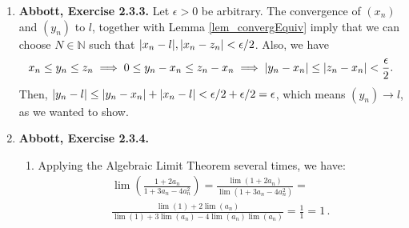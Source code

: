 \documentclass{article}
\newcounter{lemmaCounter}
\newenvironment{shortlemma}[1]{\refstepcounter{lemmaCounter}
\label{#1}\textbf{Lemma~\thelemmaCounter.}\em}
\DeclarePairedDelimiter\abs{\lvert}{\rvert}
\newcommand{\N}{\mathbb{N}}
\newcommand{\ra}{\rightarrow}
\newcommand{\exc}[2][Abbott]{\item \textbf{#1, Exercise #2.}}
\newcommand{\lep}[1][L]{#1et $\epsilon > 0$ be arbitrary}
\let\oldmax\max
\renewcommand{\max}[1]{\oldmax \left( #1 \right)}
\begin{document}
\begin{enumerate}
\begin{enumerate}
		\item Let $\epsilon > 0$ be arbitrary. Since $(x_n) \rightarrow 2$, we can choose a natural number $N_1$ such that $|x_n-2| < 2\epsilon$ for all $n \geq N_1$. We can also find a natural $N_2$ such that $\abs*{2-x_n} < 1$, for all $n \geq N_2$, which implies $|x_n| > 1$. Let $N := \max{N_1, N_2}$. Then, for all $n \geq N$, we have \begin{equation*}
		      \abs*{\frac{1}{x_n}-\frac{1}{2}} = \abs*{\frac{2-x_n}{2x_n}} < \abs*{\frac{x_n-2}{2}} < \epsilon.
		\end{equation*}
	\end{enumerate}
	
	\begin{shortlemma}{lem_convergEquiv}
	    If $(x_n), (y_n) \rightarrow L$ for some real number $L$, then for every $\epsilon > 0$ there is some natural $N$ such that $\abs*{x_n-y_n} < \epsilon$ for all $n \geq N$.
	\end{shortlemma}
	\begin{proof}
    \lep \space and use the fact that both the sequences converge to find $N_1, N_2 \in \N$ such that $\abs*{x_n - L} < \epsilon/2$ for all $n \geq N_1$ and $\abs*{y_m-L} < \epsilon/2$ for all $m \geq N_2$. Setting $N := \max{N_1, N_2}$ we have $\abs*{x_n-L} < \epsilon/2$ $\abs*{y_n-L} < \epsilon/2$ for all $n \geq N$. Summing the two inequalities, we get $\abs*{x_n-L} + \abs*{y_n-L} < \epsilon$, and we can use the triangle inequality to see that $\abs*{x_n-y_n} \leq \abs*{x_n-L} + \abs*{y_n-L} < \epsilon$, as we wanted to show.
	\end{proof}
				      	              
	\exc{2.3.3}
	\lep. The convergence of $(x_n)$ and $(y_n)$ to $l$, together with Lemma \ref{lem_convergEquiv} imply that we can choose $N \in \N$ such that $\abs*{x_n-l}, \abs*{x_n-z_n} < \epsilon/2$. Also, we have 
	\begin{equation*}
	    x_n \leq y_n \leq z_n \implies 0 \leq y_n-x_n \leq z_n-x_n \implies 
	    \abs*{y_n-x_n} \leq \abs*{z_n-x_n} < \frac{\epsilon}{2}.
	\end{equation*} Then, $\abs*{y_n-l} \leq \abs*{y_n-x_n} + \abs*{x_n-l} < \epsilon/2 + \epsilon/2 = \epsilon$, which means $(y_n) \ra l$, as we wanted to show.
	 
	\exc{2.3.4}
	\begin{enumerate}
		\item Applying the Algebraic Limit Theorem several times, we have: \begin{gather}
		      \nonumber \lim (\frac{1+2a_n}{1+3a_n-4a_{n}^2}) = \frac{\lim (1 + 2a_n)}{\lim (1 + 3a_n-4a_n^2)} = \\
		      \nonumber \frac{\lim (1) + 2\lim(a_n)}{\lim(1) + 3\lim(a_n) - 4 \lim(a_n) \lim(a_n)} = \frac{1}{1} = 1 \, .
		\end{gather}
							      		        

\end{enumerate}
\end{enumerate}
\end{document}
